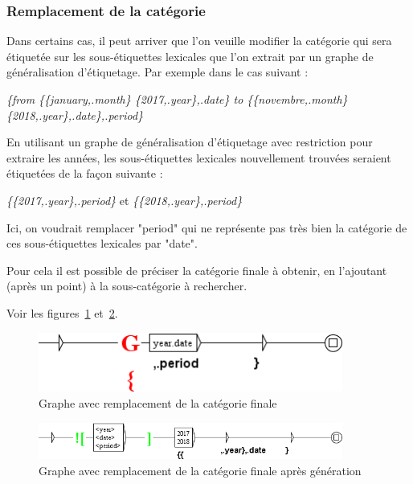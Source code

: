 \bigskip
\subsubsection{Remplacement de la catégorie}

Dans certains cas, il peut arriver que l'on veuille modifier la catégorie qui sera étiquetée sur les sous-étiquettes lexicales que l'on extrait par un graphe de généralisation d'étiquetage. Par exemple dans le cas suivant :


\emph{\{from \{\{january,.month\} \{2017,.year\},.date\} to \{\{novembre,.month\} \{2018,.year\},.date\},.period\}}


\bigskip
En utilisant un graphe de généralisation d'étiquetage avec restriction pour extraire les années, les sous-étiquettes lexicales nouvellement trouvées seraient étiquetées de la façon suivante :


\emph{\{\{2017,.year\},.period\}} et \emph{\{\{2018,.year\},.period\}}

\bigskip
Ici, on voudrait remplacer "period" qui ne représente pas très bien la catégorie de ces sous-étiquettes lexicales par "date".


Pour cela il est possible de préciser la catégorie finale à obtenir, en l'ajoutant (après un point) à la sous-catégorie à rechercher.

\bigskip
Voir les figures~\ref{fig:graphe_remplacement} et~\ref{fig:graphe_remplacement_genere}.


\begin{figure}[!htb]
  \centering
  \includegraphics[width=10cm]{resources/img/graphe_remplacement.png}
  \caption{Graphe avec remplacement de la catégorie finale}
  \label{fig:graphe_remplacement}
\end{figure}

\begin{figure}[!htb]
  \centering
  \includegraphics[width=10cm]{resources/img/graphe_remplacement_genere.png}
  \caption{Graphe avec remplacement de la catégorie finale après génération}
  \label{fig:graphe_remplacement_genere}
\end{figure}

